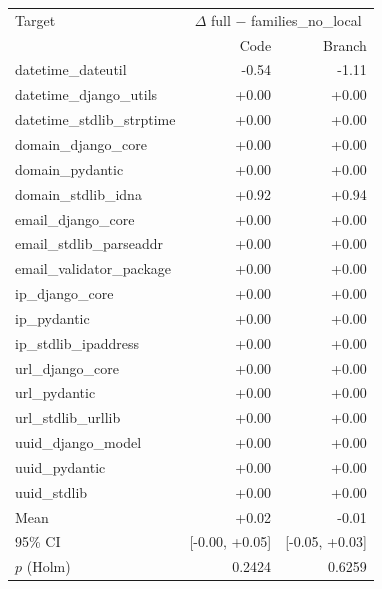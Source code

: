 \begin{tabular}{lrr}
\toprule
Target & \multicolumn{2}{c}{$\Delta$ full $-$ families\_no\_local} \\
 & Code & Branch \\
\midrule
datetime\_dateutil & -0.54 & -1.11 \\
datetime\_django\_utils & +0.00 & +0.00 \\
datetime\_stdlib\_strptime & +0.00 & +0.00 \\
domain\_django\_core & +0.00 & +0.00 \\
domain\_pydantic & +0.00 & +0.00 \\
domain\_stdlib\_idna & +0.92 & +0.94 \\
email\_django\_core & +0.00 & +0.00 \\
email\_stdlib\_parseaddr & +0.00 & +0.00 \\
email\_validator\_package & +0.00 & +0.00 \\
ip\_django\_core & +0.00 & +0.00 \\
ip\_pydantic & +0.00 & +0.00 \\
ip\_stdlib\_ipaddress & +0.00 & +0.00 \\
url\_django\_core & +0.00 & +0.00 \\
url\_pydantic & +0.00 & +0.00 \\
url\_stdlib\_urllib & +0.00 & +0.00 \\
uuid\_django\_model & +0.00 & +0.00 \\
uuid\_pydantic & +0.00 & +0.00 \\
uuid\_stdlib & +0.00 & +0.00 \\
\midrule
Mean & +0.02 & -0.01 \\
95\% CI & [-0.00, +0.05] & [-0.05, +0.03] \\
$p$ (Holm) & 0.2424 & 0.6259 \\
\bottomrule
\end{tabular}

